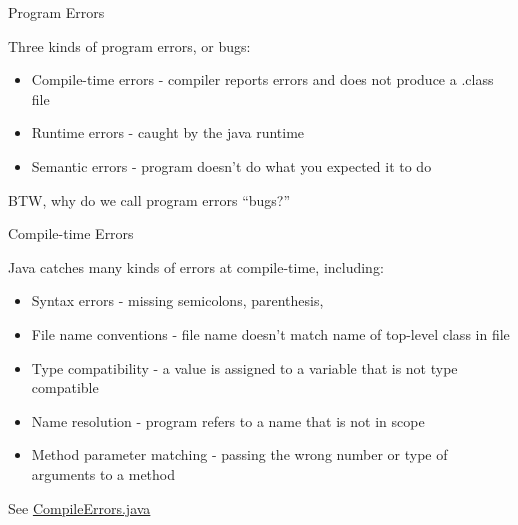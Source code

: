 \documentclass{beamer}
\author[Chris Simpkins] 
{Christopher Simpkins \\\texttt{chris.simpkins@gatech.edu}}
\institute[Georgia Tech] %
\date[CS 1331]{}
\title[\course] %
{\lesson}
\subtitle{}
\newcommand{\code}{http://www.cc.gatech.edu/~simpkins/teaching/gatech/cs1331/code}
\begin{document}
\begin{frame}
  \titlepage
\end{frame}



\begin{frame}[fragile]{Program Errors}


Three kinds of program errors, or bugs:
\begin{itemize}
\item Compile-time errors - compiler reports errors and does not produce a .class file
\item Runtime errors - caught by the java runtime
\item Semantic errors - program doesn't do what you expected it to do
\end{itemize}
\vspace{.2in}
BTW, why do we call program errors ``bugs?''

\end{frame}

\begin{frame}[fragile]{Compile-time Errors}


Java catches many kinds of errors at compile-time, including:
\begin{itemize}
\item Syntax errors - missing semicolons, parenthesis, 
\item File name conventions - file name doesn't match name of top-level class in file
\item Type compatibility - a value is assigned to a variable that is not type compatible
\item Name resolution - program refers to a name that is not in scope
\item Method parameter matching - passing the wrong number or type of arguments to a method
\end{itemize}

\vspace{.2in}
See \href{\code/CompileErrors.java}{CompileErrors.java}

\end{frame}
\end{document}
